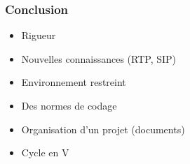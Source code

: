\begin{frame}
    \frametitle{Conclusion}
    \begin{itemize}
        \item Rigueur
        \item Nouvelles connaissances (RTP, SIP)
        \item Environnement restreint
        \item Des normes de codage
        \item Organisation d'un projet (documents)
        \item Cycle en V
    \end{itemize}
\end{frame}